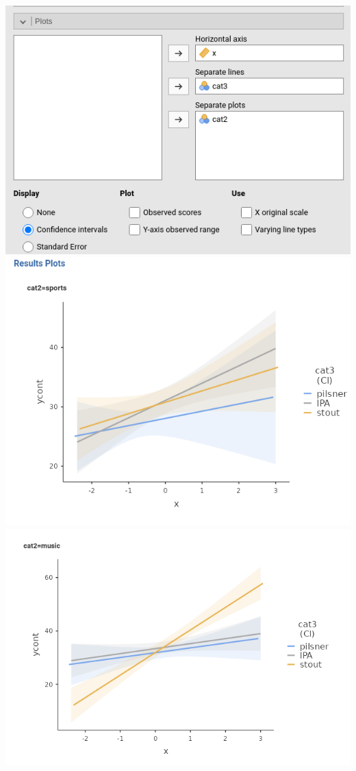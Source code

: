 \documentclass[
]{book}
\begin{document}
\includegraphics{bookletpics/2_ancova_input4.png}
\includegraphics{bookletpics/2_ancova_output4a.png}
\includegraphics{bookletpics/2_ancova_output4b.png}
\end{document}
